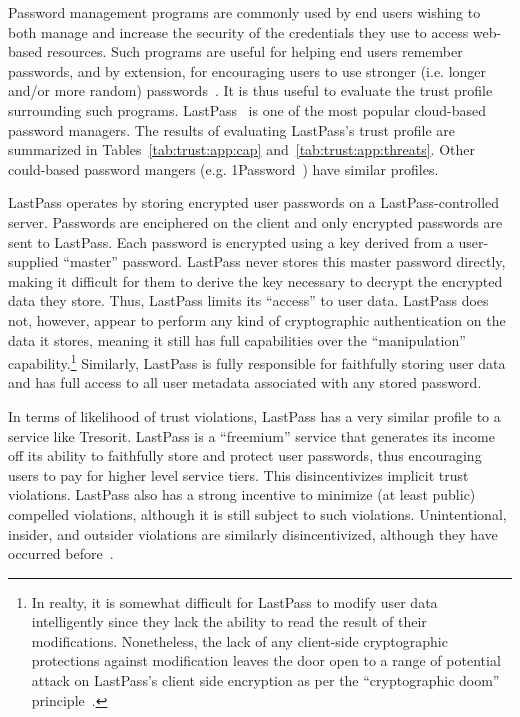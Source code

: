Password management programs are commonly used by end users wishing to
both manage and increase the security of the credentials they use to
access web-based resources. Such programs are useful for helping end
users remember passwords, and by extension, for encouraging users to
use stronger (i.e. longer and/or more random)
passwords~\cite{brodkin-passman, krebs-passwords,
  schneier-passwords}. It is thus useful to evaluate the trust profile
surrounding such programs. LastPass~\cite{lastpass} is one of the most
popular cloud-based password managers. The results of evaluating
LastPass's trust profile are summarized in
Tables~\ref{tab:trust:app:cap} and~\ref{tab:trust:app:threats}. Other
could-based password mangers (e.g. 1Password~\cite{onepassword}) have
similar profiles.

LastPass operates by storing encrypted user passwords on a
LastPass-controlled server. Passwords are enciphered on the client and
only encrypted passwords are sent to LastPass. Each password is
encrypted using a key derived from a user-supplied ``master''
password. LastPass never stores this master password directly, making
it difficult for them to derive the key necessary to decrypt the
encrypted data they store. Thus, LastPass limits its ``access'' to
user data. LastPass does not, however, appear to perform any kind of
cryptographic authentication on the data it stores, meaning it still
has full capabilities over the ``manipulation''
capability.\footnote{In realty, it is somewhat difficult for LastPass
  to modify user data intelligently since they lack the ability to
  read the result of their modifications. Nonetheless, the lack of any
  client-side cryptographic protections against modification leaves
  the door open to a range of potential attack on LastPass's client
  side encryption as per the ``cryptographic doom''
  principle~\cite{marlinspike-doom}.}  Similarly, LastPass is fully
responsible for faithfully storing user data and has full access to
all user metadata associated with any stored password.

In terms of likelihood of trust violations, LastPass has a very
similar profile to a service like Tresorit. LastPass is a ``freemium''
service that generates its income off its ability to faithfully store
and protect user passwords, thus encouraging users to pay for higher
level service tiers. This disincentivizes implicit trust
violations. LastPass also has a strong incentive to minimize (at least
public) compelled violations, although it is still subject to such
violations. Unintentional, insider, and outsider violations are
similarly disincentivized, although they have occurred
before~\cite{lastpass-blog-breach}.

